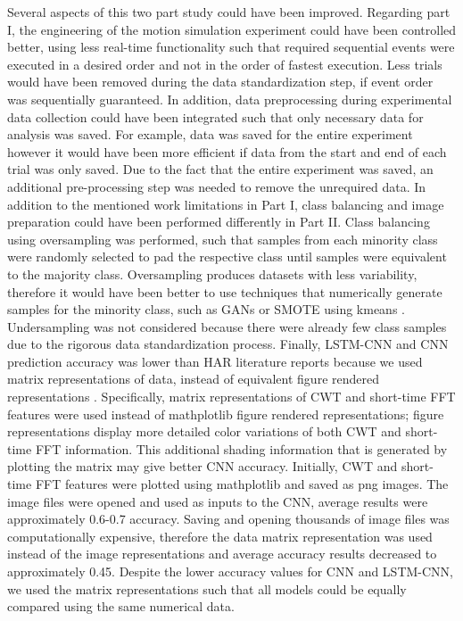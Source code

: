 \documentclass{ieeeaccess}
\begin{document}
Several aspects of this two part study could have been improved. Regarding part I, the engineering of the motion simulation experiment could have been controlled better, using less real-time functionality such that required sequential events were executed in a desired order and not in the order of fastest execution. Less trials would have been removed during the data standardization step, if event order was sequentially guaranteed. In addition, data preprocessing during experimental data collection could have been integrated such that only necessary data for analysis was saved. For example, data was saved for the entire experiment however it would have been more efficient if data from the start and end of each trial was only saved. Due to the fact that the entire experiment was saved, an additional pre-processing step was needed to remove the unrequired data. In addition to the mentioned work limitations in Part I, class balancing and image preparation could have been performed differently in Part II. Class balancing using oversampling was performed, such that samples from each minority class were randomly selected to pad the respective class until samples were equivalent to the majority class. Oversampling produces datasets with less variability, therefore it would have been better to use techniques that numerically generate samples for the minority class, such as GANs or SMOTE using kmeans \cite{An_2021_Mgait}. Undersampling was not considered because there were already few class samples due to the rigorous data standardization process. Finally, LSTM-CNN and CNN prediction accuracy was lower than HAR literature reports because we used matrix representations of data, instead of equivalent figure rendered representations \cite{Nedorubova_2021_CWT_CNN_HumanActivity}. Specifically, matrix representations of CWT and short-time FFT features were used instead of mathplotlib figure rendered representations; figure representations display more detailed color variations of both CWT and short-time FFT information. This additional shading information that is generated by plotting the matrix may give better CNN accuracy. Initially, CWT and short-time FFT features were plotted using mathplotlib and saved as png images. The image files were opened and used as inputs to the CNN, average results were approximately 0.6-0.7 accuracy. Saving and opening thousands of image files was computationally expensive, therefore the data matrix representation was used instead of the image representations and average accuracy results decreased to approximately 0.45. Despite the lower accuracy values for CNN and LSTM-CNN, we used the matrix representations such that all models could be equally compared using the same numerical data.
\end{document}
